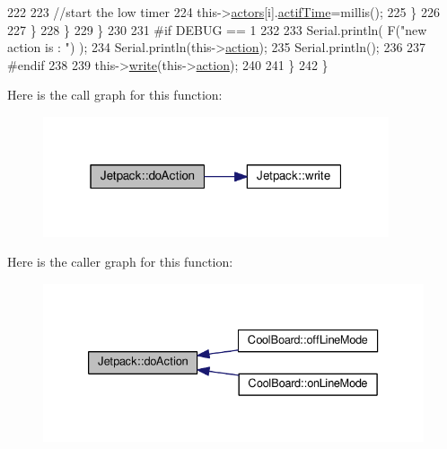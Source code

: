 \begin{DoxyCode}
222 
223                         \textcolor{comment}{//start the low timer}
224                         this->\hyperlink{classJetpack_a7e16d2f97837f9712a2e6de1c50d99db}{actors}[i].\hyperlink{structJetpack_1_1state_af2e1cc323ef9ffcc3cf4d203f85d726b}{actifTime}=millis();              
225                     \}           
226             
227                 \}
228             \}
229         \}
230     
231 \textcolor{preprocessor}{    #if DEBUG == 1 }
232 
233         Serial.println( F(\textcolor{stringliteral}{"new action is : "}) );
234         Serial.println(this->\hyperlink{classJetpack_aca3142925a7b0834b34ae91d26af7765}{action});
235         Serial.println();
236     
237 \textcolor{preprocessor}{    #endif }
238 
239         this->\hyperlink{classJetpack_a338f1af8cbc6504ac69b47c7328569b5}{write}(this->\hyperlink{classJetpack_aca3142925a7b0834b34ae91d26af7765}{action});
240 
241     \} 
242 \}
\end{DoxyCode}
Here is the call graph for this function\+:
\nopagebreak
\begin{figure}[H]
\begin{center}
\leavevmode
\includegraphics[width=289pt]{classJetpack_a86d2e83436ef4b85f4c3a6e85ac785b0_cgraph}
\end{center}
\end{figure}
Here is the caller graph for this function\+:
\nopagebreak
\begin{figure}[H]
\begin{center}
\leavevmode
\includegraphics[width=333pt]{classJetpack_a86d2e83436ef4b85f4c3a6e85ac785b0_icgraph}
\end{center}
\end{figure}
\mbox{\label{classJetpack_ac54a7bb4f9166bee32052253d9b1d306}} 
